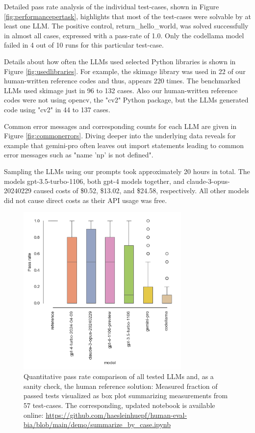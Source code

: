 \documentclass{ecai}
\begin{document}
Detailed pass rate analysis of the individual test-cases, shown in Figure \ref{fig:performancepertask}, highlights that most of the test-cases were solvable by at least one LLM. The positive control, return\_hello\_world, was solved successfully in almost all cases, expressed with a pass-rate of 1.0. Only the codellama model failed in 4 out of 10 runs for this particular test-case. 

Details about how often the LLMs used selected Python libraries is shown in Figure \ref{fig:usedlibraries}. For example, the skimage library was used in 22 of our human-written reference codes and thus, appears 220 times. The benchmarked LLMs used skimage just in 96 to 132 cases. Also our human-written reference codes were not using opencv, the "cv2" Python package, but the LLMs generated code using "cv2" in 44 to 137 cases.

Common error messages and corresponding counts for each LLM are given in Figure \ref{fig:commonerrors}. Diving deeper into the underlying data reveals for example that gemini-pro often leaves out import statements leading to common error messages such as "name 'np' is not defined".

Sampling the LLMs using our prompts took approximately 20 hours in total. The models gpt-3.5-turbo-1106, both gpt-4 models together, and claude-3-opus-20240229 caused costs of \$0.52, \$13.02, and \$24.58, respectively. All other models did not cause direct costs as their API usage was free. 

\begin{figure}[h]
\centering
\includegraphics[width=8.5cm]{pass_rate_llms.png}
\caption{Quantitative pass rate comparison of all tested LLMs and, as a sanity check, the human reference solution: Measured fraction of passed tests visualized as box plot summarizing measurements from 57 test-cases. The corresponding, updated notebook is available online: 
\url{https://github.com/haesleinhuepf/human-eval-bia/blob/main/demo/summarize_by_case.ipynb}
\newline
\newline
}
\label{fig:passratellms}
\end{figure}
\end{document}

